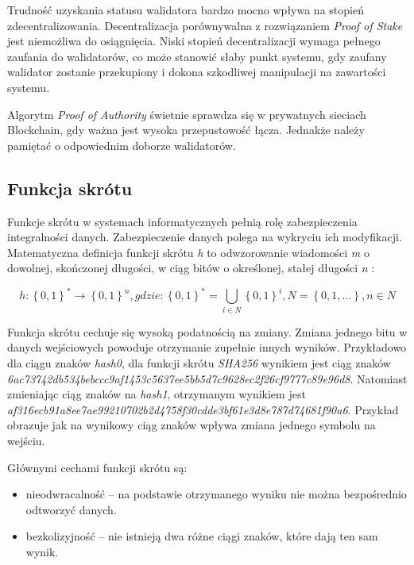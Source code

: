 \documentclass[a4paper,12pt]{book}
\begin{document}
Trudność uzyskania statusu walidatora bardzo mocno wpływa na stopień zdecentralizowania. Decentralizacja porównywalna z rozwiązaniem \textit{Proof of Stake} jest niemożliwa do osiągnięcia.
Niski stopień decentralizacji wymaga pełnego zaufania do walidatorów, co może stanowić słaby punkt systemu, gdy zaufany walidator zostanie przekupiony i dokona szkodliwej manipulacji na zawartości systemu.

Algorytm \textit{Proof of Authority} świetnie sprawdza się w prywatnych sieciach Blockchain, gdy ważna jest wysoka przepustowość łącza. Jednakże należy pamiętać o odpowiednim doborze walidatorów\cite{abpoa}.

\subsection{Funkcja skrótu}

Funkcje skrótu w systemach informatycznych pełnią rolę zabezpieczenia integralności danych. Zabezpieczenie danych polega na wykryciu ich modyfikacji. Matematyczna definicja funkcji skrótu \textit{h} to odwzorowanie wiadomości \textit{m} o dowolnej, skończonej długości, w ciąg bitów o określonej, stałej długości \textit{n} \cite{hash}:

\begin{equation}
h:\left \{0, 1\right \}^{*}\rightarrow \left \{0, 1\right \}^{n}, gdzie: \left \{0, 1\right \}^{*}=\bigcup_{i\in  N}\left \{0, 1\right \}^{i}, N = \left \{0, 1, ...\right \}, n \in N
\end{equation}

Funkcja skrótu cechuje się wysoką podatnością na zmiany. Zmiana jednego bitu w danych wejściowych powoduje otrzymanie zupełnie innych wyników. \newline
Przykładowo dla ciągu znaków \textit{hash0}, dla funkcji skrótu \textit{SHA256} wynikiem jest ciąg znaków
\newline \textit{6ac73742db534bebccc9af1453c5637ee5bb5d7c9628ec2f26cf9777c89e96d8}. Natomiast zmieniając ciąg znaków na \textit{hash1}, otrzymanym wynikiem jest \newline \textit{af316ecb91a8ee7ae99210702b2d4758f30cdde3bf61e3d8e787d74681f90a6}. Przykład obrazuje jak na wynikowy ciąg znaków wpływa zmiana jednego symbolu na wejściu.

Głównymi cechami funkcji skrótu są:
\begin{itemize}
	\item nieodwracalność -- na podstawie otrzymanego wyniku nie można bezpośrednio odtworzyć danych.
	\item bezkolizyjność -- nie istnieją dwa różne ciągi znaków, które dają ten sam wynik.
\end{itemize}
\end{document}
